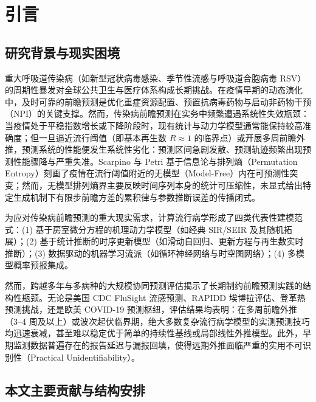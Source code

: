\documentclass[11pt,a4paper]{article}
\theoremstyle{plain}
\theoremstyle{definition}
\begin{document}
\vspace{0.6em}

\section{引言}\label{sec:intro}

\subsection{研究背景与现实困境}

重大呼吸道传染病（如新型冠状病毒感染、季节性流感与呼吸道合胞病毒 RSV）的周期性暴发对全球公共卫生与医疗体系构成长期挑战。在疫情早期的动态演化中，及时可靠的前瞻预测是优化重症资源配置、预置抗病毒药物与启动非药物干预（NPI）的关键支撑。然而，传染病前瞻预测在实务中频繁遭遇系统性失效瓶颈：当疫情处于平稳指数增长或下降阶段时，现有统计与动力学模型通常能保持较高准确度；但一旦逼近流行阈值（即基本再生数 $R \approx 1$ 的临界点）或开展多周前瞻外推，预测系统的性能便发生系统性劣化：预测区间急剧发散、预测轨迹频繁出现预测性能骤降与严重失准\citep{reich2019collaborative}。Scarpino 与 Petri\citep{scarpino2019predictability} 基于信息论与排列熵（Permutation Entropy）刻画了疫情在流行阈值附近的无模型（Model-Free）内在可预测性突变；然而，无模型排列熵界主要反映时间序列本身的统计可压缩性，未显式给出特定生成机制下有限步前瞻方差的累积律与参数推断误差的传播闭式。

为应对传染病前瞻预测的重大现实需求，计算流行病学形成了四类代表性建模范式：(1) 基于房室微分方程的机理动力学模型（如经典 SIR/SEIR 及其随机拓展）；(2) 基于统计推断的时序更新模型（如滑动自回归、更新方程与再生数实时推断）；(3) 数据驱动的机器学习流派（如循环神经网络与时空图网络）；(4) 多模型概率预报集成。

然而，跨越多年与多病种的大规模协同预测评估揭示了长期制约前瞻预测实践的结构性瓶颈。无论是美国 CDC FluSight 流感预测\citep{mcgowan2019collaborative, flusight2024evaluation}、RAPIDD 埃博拉评估\citep{viboud2018rapidd}、登革热预测挑战\citep{johansson2019open}，还是欧美 COVID-19 预测枢纽\citep{cramer2022evaluation, sherratt2023europeanhubs}，评估结果均表明：在多周前瞻外推（3--4 周及以上）或波次起伏临界期，绝大多数复杂流行病学模型的实测预测技巧均迅速衰减，甚至难以稳定优于简单的持续性基线或局部线性外推模型\citep{suez2026baseline, lopez2024challenges}。此外，早期监测数据普遍存在的报告延迟与漏报回填，使得远期外推面临严重的实用不可识别性（Practical Unidentifiability）\citep{melikechi2022limits, king2015avoidable}。

\subsection{本文主要贡献与结构安排}
\end{document}

